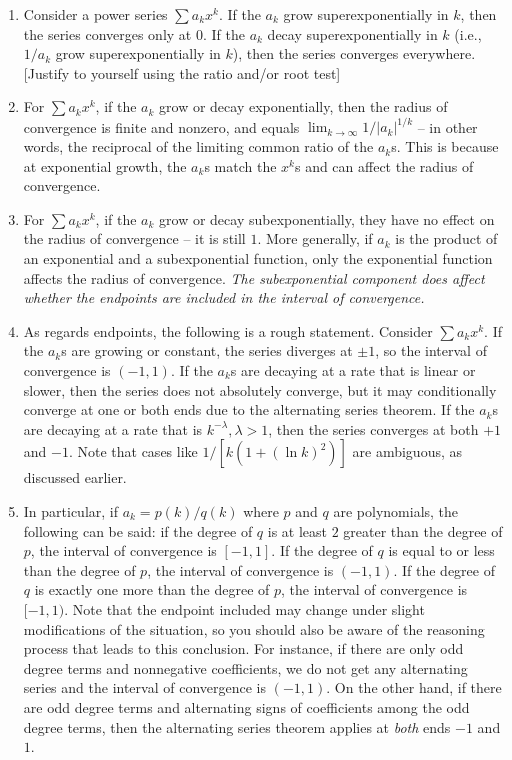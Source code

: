 \documentclass[10pt]{amsart}
\begin{document}
\begin{enumerate}
\item Consider a power series $\sum a_kx^k$. If the $a_k$ grow
  superexponentially in $k$, then the series converges only at $0$. If
  the $a_k$ decay superexponentially in $k$ (i.e., $1/a_k$ grow
  superexponentially in $k$), then the series converges
  everywhere. [Justify to yourself using the ratio and/or root test]
\item For $\sum a_kx^k$, if the $a_k$ grow or decay exponentially,
  then the radius of convergence is finite and nonzero, and equals
  $\lim_{k \to \infty} 1/|a_k|^{1/k}$ -- in other words, the
  reciprocal of the limiting common ratio of the $a_k$s. This is
  because at exponential growth, the $a_k$s match the $x^k$s and can
  affect the radius of convergence.
\item For $\sum a_kx^k$, if the $a_k$ grow or decay subexponentially,
  they have no effect on the radius of convergence -- it is still
  $1$. More generally, if $a_k$ is the product of an exponential and a
  subexponential function, only the exponential function affects the
  radius of convergence. {\em The subexponential component does affect
  whether the endpoints are included in the interval of convergence.}
\item As regards endpoints, the following is a rough
  statement. Consider $\sum a_kx^k$. If the $a_k$s are growing or
  constant, the series diverges at $\pm 1$, so the interval of
  convergence is $(-1,1)$. If the $a_k$s are decaying at a rate that
  is linear or slower, then the series does not absolutely converge,
  but it may conditionally converge at one or both ends due to the
  alternating series theorem. If the $a_k$s are decaying at a rate
  that is $k^{-\lambda}, \lambda > 1$, then the series converges at
  both $+1$ and $-1$. Note that cases like $1/[k(1 + (\ln k)^2)]$ are
  ambiguous, as discussed earlier.
\item In particular, if $a_k = p(k)/q(k)$ where $p$ and $q$ are
  polynomials, the following can be said: if the degree of $q$ is at
  least $2$ greater than the degree of $p$, the interval of
  convergence is $[-1,1]$. If the degree of $q$ is equal to or less
  than the degree of $p$, the interval of convergence is $(-1,1)$. If
  the degree of $q$ is exactly one more than the degree of $p$, the
  interval of convergence is $[-1,1)$. Note that the endpoint included
  may change under slight modifications of the situation, so you
  should also be aware of the reasoning process that leads to this
  conclusion. For instance, if there are only odd degree terms and
  nonnegative coefficients, we do not get any alternating series and
  the interval of convergence is $(-1,1)$. On the other hand, if there
  are odd degree terms and alternating signs of coefficients among the
  odd degree terms, then the alternating series theorem applies at
  {\em both} ends $-1$ and $1$.
\end{enumerate}
\end{document}
